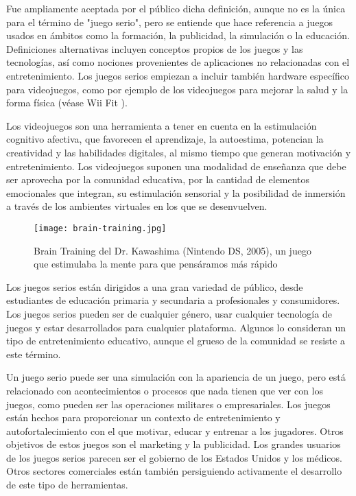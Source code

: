 Fue ampliamente aceptada por el público dicha definición, aunque no es la única para el término de "juego serio", pero se entiende que hace referencia a juegos usados en ámbitos como la formación, la publicidad, la simulación o la educación. Definiciones alternativas incluyen conceptos propios de los juegos y las tecnologías, así como nociones provenientes de aplicaciones no relacionadas con el entretenimiento. Los juegos serios empiezan a incluir también hardware específico para videojuegos, como por ejemplo de los videojuegos para mejorar la salud y la forma física (véase Wii Fit ).

Los videojuegos son una herramienta a tener en cuenta en la estimulación cognitivo afectiva, que favorecen el aprendizaje, la autoestima, potencian la creatividad y las habilidades digitales, al mismo tiempo que generan motivación y entretenimiento. Los videojuegos suponen una modalidad de enseñanza que debe ser aprovecha por la comunidad educativa, por la cantidad de elementos emocionales que integran, su estimulación sensorial y la posibilidad de inmersión a través de los ambientes virtuales en los que se desenvuelven.

\begin{figure}[H] 
	\begin{center}
		\texttt{[image: brain-training.jpg]}
	\end{center}
	\caption{Brain Training del Dr. Kawashima (Nintendo DS, 2005), un juego que estimulaba la mente para que pensáramos más rápido }
	\label{fig:brain-training}
\end{figure}

Los juegos serios están dirigidos a una gran variedad de público, desde estudiantes de educación primaria y secundaria a profesionales y consumidores. Los juegos serios pueden ser de cualquier género, usar cualquier tecnología de juegos y estar desarrollados para cualquier plataforma. Algunos lo consideran un tipo de entretenimiento educativo, aunque el grueso de la comunidad se resiste a este término.

Un juego serio puede ser una simulación con la apariencia de un juego, pero está relacionado con acontecimientos o procesos que nada tienen que ver con los juegos, como pueden ser las operaciones militares o empresariales. Los juegos están hechos para proporcionar un contexto de entretenimiento y autofortalecimiento con el que motivar, educar y entrenar a los jugadores. Otros objetivos de estos juegos son el marketing y la publicidad. Los grandes usuarios de los juegos serios parecen ser el gobierno de los Estados Unidos y los médicos. Otros sectores comerciales están también persiguiendo activamente el desarrollo de este tipo de herramientas.

